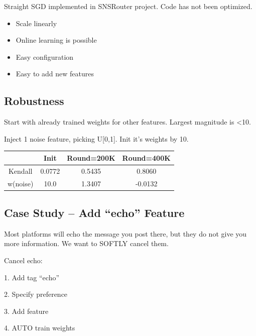 \documentclass{sig-alternate}
\begin{document}
Straight SGD implemented in SNSRouter project. Code has not been optimized.

\begin{itemize}
	\item Scale linearly
	\item Online learning is possible
	\item Easy configuration
	\item Easy to add new features
\end{itemize}

\subsection{Robustness}
\label{sec:Robustness}

Start with already trained weights for
other features. Largest magnitude is <10.

Inject 1 noise feature, picking U[0,1]. Init
it’s weights by 10.

\begin{table}
	\begin{tabular}{|c|c|c|c|}
		\hline 
		& Init & Round=200K & Round=400K \\
		\hline 
Kendall & 0.0772 & 0.5435 & 0.8060 \\
 w(noise) & 10.0 & 1.3407 & -0.0132 \\
		\hline
	\end{tabular}
\end{table}

\subsection{Case Study -- Add ``echo'' Feature}
\label{sec:Case Study -- Add ``echo'' Feature}

Most platforms will echo the
message you post there, but they
do not give you more information.
We want to SOFTLY cancel them.

Cancel echo:

1. Add tag ``echo''

2. Specify preference

3. Add feature

4. AUTO train weights
\end{document}
